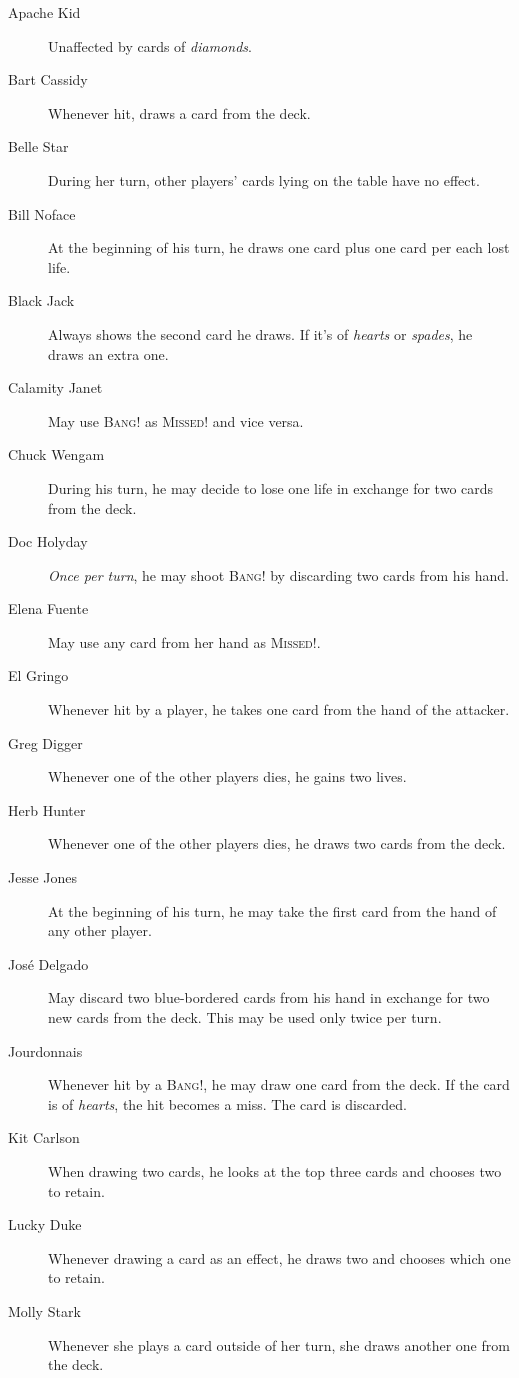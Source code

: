 \documentclass[a4paper,10pt,reqno]{amsart}
\newcommand{\card}[1]{\textsc{#1}}
\newcommand{\col}[1]{\textit{#1}}
\begin{document}
	\begin{description}
		\item[Apache Kid] Unaffected by cards of \col{diamonds}.
		\item[Bart Cassidy] Whenever hit, draws a card from the deck.
		\item[Belle Star] During her turn, other players' cards lying on the table have no effect.
		\item[Bill Noface] At the beginning of his turn, he draws one card plus one card per each lost life.
		\item[Black Jack] Always shows the second card he draws. If it's of \col{hearts} or \col{spades},
			he draws an extra one.
		\item[Calamity Janet] May use \card{Bang!} as \card{Missed!} and vice versa.
		\item[Chuck Wengam] During his turn, he may decide to lose one life in exchange for
			two cards from the deck.
		\item[Doc Holyday] \emph{Once per turn}, he may shoot \card{Bang!} by discarding two cards from his hand.
		\item[Elena Fuente] May use any card from her hand as \card{Missed!}.
		\item[El Gringo] Whenever hit by a player, he takes one card from the hand of the attacker.
		\item[Greg Digger] Whenever one of the other players dies, he gains two lives.
		\item[Herb Hunter] Whenever one of the other players dies, he draws two cards from the deck.
		\item[Jesse Jones] At the beginning of his turn, he may take the first card from the hand
			of any other player.
		\item[José Delgado] May discard two blue-bordered cards from his hand in exchange for two new cards
			from the deck. This may be used only twice per turn.
		\item[Jourdonnais] Whenever hit by a \card{Bang!}, he may draw one card from the deck.
			If the card is of \col{hearts}, the hit becomes a miss. The card is discarded.
		\item[Kit Carlson] When drawing two cards, he looks at the top three cards and chooses two to retain.
		\item[Lucky Duke] Whenever drawing a card as an effect, he draws two and chooses which one to retain.
		\item[Molly Stark] Whenever she plays a card outside of her turn, she draws another one from the deck.

\end{description}
\end{document}
